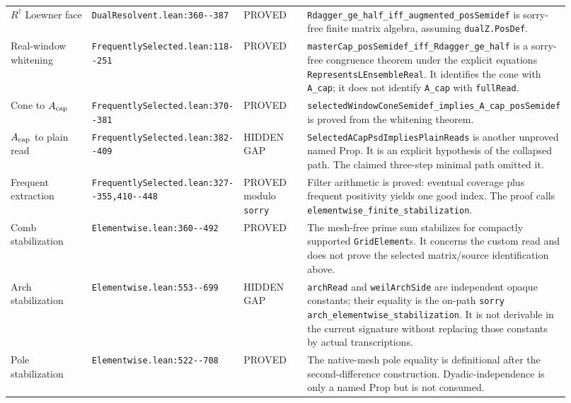 \documentclass[10pt]{article}
\newcommand{\ok}{\textcolor{green!45!black}{PROVED}}
\newcommand{\gap}{\textcolor{red!75!black}{HIDDEN GAP}}
\newcommand{\code}[1]{\nolinkurl{#1}}
\begin{document}
\begin{longtable}{@{}p{0.19\linewidth}p{0.24\linewidth}p{0.14\linewidth}p{0.35\linewidth}@{}}
$R^\dagger$ Loewner face & \code{DualResolvent.lean:360--387} & \ok &
\code{Rdagger_ge_half_iff_augmented_posSemidef} is sorry-free finite
matrix algebra, assuming \code{dualZ.PosDef}. \\

Real-window whitening & \code{FrequentlySelected.lean:118--251} & \ok &
\code{masterCap_posSemidef_iff_Rdagger_ge_half} is a sorry-free
congruence theorem under the explicit equations
\code{RepresentsLEnsembleReal}.  It identifies the cone with
\code{A_cap}; it does not identify \code{A_cap} with \code{fullRead}. \\

Cone to $A_{\rm cap}$ & \code{FrequentlySelected.lean:370--381} & \ok &
\code{selectedWindowConeSemidef_implies_A_cap_posSemidef} is proved
from the whitening theorem. \\

$A_{\rm cap}$ to plain read & \code{FrequentlySelected.lean:382--409} &
\gap &
\code{SelectedACapPsdImpliesPlainReads} is another unproved named
Prop.  It is an explicit hypothesis of the collapsed path.  The
claimed three-step minimal path omitted it. \\

Frequent extraction & \code{FrequentlySelected.lean:327--355,410--448} &
\ok{} modulo \code{sorry} &
Filter arithmetic is proved: eventual coverage plus frequent
positivity yields one good index.  The proof calls
\code{elementwise_finite_stabilization}. \\

Comb stabilization & \code{Elementwise.lean:360--492} & \ok &
The mesh-free prime sum stabilizes for compactly supported
\code{GridElement}s.  It concerns the custom read and does not prove
the selected matrix/source identification above. \\

Arch stabilization & \code{Elementwise.lean:553--699} & \gap &
\code{archRead} and \code{weilArchSide} are independent opaque
constants; their equality is the on-path \code{sorry}
\code{arch_elementwise_stabilization}.  It is not derivable in the
current signature without replacing those constants by actual
transcriptions. \\

Pole stabilization & \code{Elementwise.lean:522--708} & \ok &
The native-mesh pole equality is definitional after the
second-difference construction.  Dyadic-independence is only a named
Prop but is not consumed. \\


\end{longtable}
\end{document}
